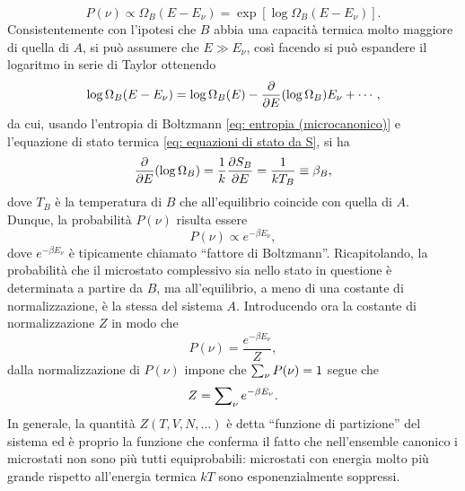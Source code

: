 \begin{equation}
    P(\nu) \propto \Omega_B(E - E_\nu) = \exp{[\log{\Omega_B(E - E_\nu)}]}.
\end{equation}
Consistentemente con l'ipotesi che $B$ abbia una capacità termica molto maggiore di quella di $A$, si può assumere che $E \gg E_\nu$, così facendo si può espandere il logaritmo in serie di Taylor ottenendo
\begin{equation}
    \log{\Omega_B(E - E_\nu)} = \log{\Omega_B(E)} - \frac{\partial}{\partial E}(\log{\Omega_B})E_\nu + \cdots,
\end{equation}
da cui, usando l'entropia di Boltzmann \eqref{eq: entropia (microcanonico)} e l'equazione di stato termica \eqref{eq: equazioni di stato da S}, si ha
\begin{equation}
    \frac{\partial}{\partial E}(\log{\Omega_B}) = \frac{1}{k}\frac{\partial S_B}{\partial E} = \frac{1}{kT_B} \equiv \beta_B,
\end{equation}
dove $T_B$ è la temperatura di $B$ che all'equilibrio coincide con quella di $A$. Dunque, la probabilità $P(\nu)$ risulta essere
\begin{equation}
    P(\nu) \propto e^{-\beta E_\nu},
\end{equation}
dove $e^{-\beta E_\nu}$ è tipicamente chiamato ``fattore di Boltzmann''. Ricapitolando, la probabilità che il microstato complessivo sia nello stato in questione è determinata a partire da $B$, ma all'equilibrio, a meno di una costante di normalizzazione, è la stessa del sistema $A$. Introducendo ora la costante di normalizzazione $Z$ in modo che 
\begin{equation}
\label{eq: probabilità microstati (canonico)}
    P(\nu) = \frac{e^{-\beta E_\nu}}{Z},
\end{equation}
dalla normalizzazione di $P(\nu)$ impone che $\sum\nolimits_\nu P(\nu) = 1$ segue che
\begin{equation}
\label{eq: funzione di partizione (canonico)}
    Z = \sum\nolimits_\nu e^{-\beta E_\nu}.
\end{equation}
In generale, la quantità $Z(T,V,N,\dots)$ è detta ``funzione di partizione'' del sistema ed è proprio la funzione che conferma il fatto che nell'ensemble canonico i microstati non sono più tutti equiprobabili: microstati con energia molto più grande rispetto all'energia termica $kT$ sono esponenzialmente soppressi.

